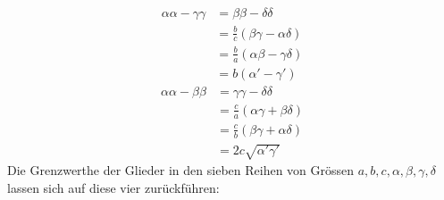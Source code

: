 \[
\begin{aligned}\alpha\alpha-\gamma\gamma&=\beta\beta-\delta\delta
\\&=\frac bc(\beta\gamma-\alpha\delta)\\&=\frac ba(\alpha\beta-\gamma\delta)
\\&=b(\alpha'-\gamma')\end{aligned}
\]
\[
\begin{aligned}\alpha\alpha-\beta\beta&=\gamma\gamma-\delta\delta
\\&=\frac ca(\alpha\gamma+\beta\delta)\\&=\frac cb(\beta\gamma+\alpha\delta)
\\&=2c\surd{\alpha'\gamma'}\end{aligned}
\]
Die Grenzwerthe der Glieder in den sieben Reihen von Grössen $a,\allowbreak b,\allowbreak c,\allowbreak \alpha,\allowbreak \beta,\allowbreak \gamma,\allowbreak \delta$
lassen sich auf diese vier zurückführen:

